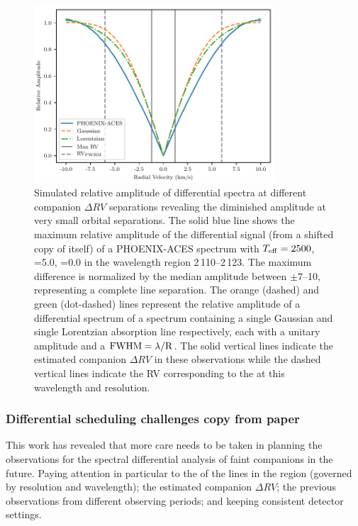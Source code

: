 \begin{figure}
    \centering
    \includegraphics[width=0.8\textwidth]{figures/direct-recovery/rv_diff_final.pdf}
    \caption{Simulated relative amplitude of differential spectra at different companion \(\Delta RV\) separations revealing the diminished amplitude at very small orbital separations.
    The solid blue line shows the maximum relative amplitude of the differential signal (from a shifted copy of itself) of a {PHOENIX-ACES} spectrum with \(T_{\mathrm{eff}}{}=2500\)\K{}, \logg{}=5.0, \feh{}=0.0 in the wavelength region 2\,110--2\,123\nm{}.
    The maximum difference is normalized by the median amplitude between \(\pm7\)--10\kmps{}, representing a complete line separation.
    The orange (dashed) and green (dot-dashed) lines represent the relative amplitude of a differential spectrum of a spectrum containing a single Gaussian and single Lorentzian absorption line respectively, each with a unitary amplitude and a \(\rm {\textrm{FWHM}} = \lambda / R\).
    The solid vertical lines indicate the estimated companion \(\Delta {RV}\) in these observations while the dashed vertical lines indicate the {RV} corresponding to the {\fwhm} at this wavelength and resolution.}
    \label{fig:diff_amp}
\end{figure}








\subsubsection{Differential scheduling challenges {copy from paper}}
\label{subsubsec:differential-schedualing}
This work has revealed that more care needs to be taken in planning the observations for the spectral differential analysis of faint companions in the future.
Paying attention in particular to the {\fwhm} of the lines in the region (governed by resolution and wavelength); the estimated companion \(\Delta {RV}\); the previous observations from different observing periods; and keeping consistent detector settings.

